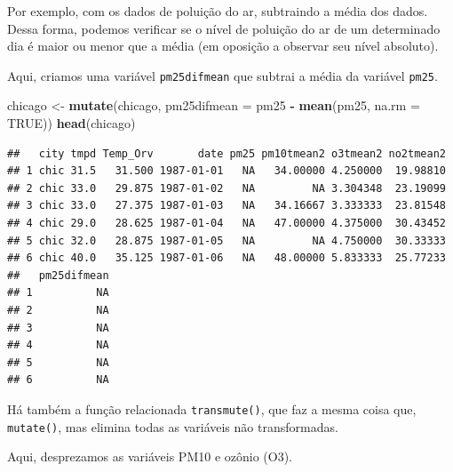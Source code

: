 \documentclass[a4paper]{book}
\newenvironment{Shaded}{\begin{snugshade}}{\end{snugshade}}
\newcommand{\DataTypeTok}[1]{\textcolor[rgb]{0.13,0.29,0.53}{#1}}
\newcommand{\KeywordTok}[1]{\textcolor[rgb]{0.13,0.29,0.53}{\textbf{#1}}}
\newcommand{\NormalTok}[1]{#1}
\newcommand{\OperatorTok}[1]{\textcolor[rgb]{0.81,0.36,0.00}{\textbf{#1}}}
\newcommand{\OtherTok}[1]{\textcolor[rgb]{0.56,0.35,0.01}{#1}}
\newcommand{\StringTok}[1]{\textcolor[rgb]{0.31,0.60,0.02}{#1}}
\begin{document}
Por exemplo, com os dados de poluição do ar, subtraindo a média dos dados. Dessa forma, podemos verificar se o nível de poluição do ar de um determinado dia é maior ou menor que a média (em oposição a observar seu nível absoluto).

Aqui, criamos uma variável \texttt{pm25difmean} que subtrai a média da variável \texttt{pm25}.

\begin{Shaded}
\begin{Highlighting}[]
\NormalTok{chicago <-}\StringTok{ }\KeywordTok{mutate}\NormalTok{(chicago, }\DataTypeTok{pm25difmean =}\NormalTok{ pm25 }\OperatorTok{-}\StringTok{ }\KeywordTok{mean}\NormalTok{(pm25, }\DataTypeTok{na.rm =} \OtherTok{TRUE}\NormalTok{))}
\KeywordTok{head}\NormalTok{(chicago)}
\end{Highlighting}
\end{Shaded}

\begin{verbatim}
##   city tmpd Temp_Orv       date pm25 pm10tmean2 o3tmean2 no2tmean2
## 1 chic 31.5   31.500 1987-01-01   NA   34.00000 4.250000  19.98810
## 2 chic 33.0   29.875 1987-01-02   NA         NA 3.304348  23.19099
## 3 chic 33.0   27.375 1987-01-03   NA   34.16667 3.333333  23.81548
## 4 chic 29.0   28.625 1987-01-04   NA   47.00000 4.375000  30.43452
## 5 chic 32.0   28.875 1987-01-05   NA         NA 4.750000  30.33333
## 6 chic 40.0   35.125 1987-01-06   NA   48.00000 5.833333  25.77233
##   pm25difmean
## 1          NA
## 2          NA
## 3          NA
## 4          NA
## 5          NA
## 6          NA
\end{verbatim}

Há também a função relacionada \texttt{transmute()}, que faz a mesma coisa que, \texttt{mutate()}, mas elimina todas as variáveis não transformadas.

Aqui, desprezamos as variáveis PM10 e ozônio (O3).

\begin{Shaded}
\end{Shaded}
\end{document}
